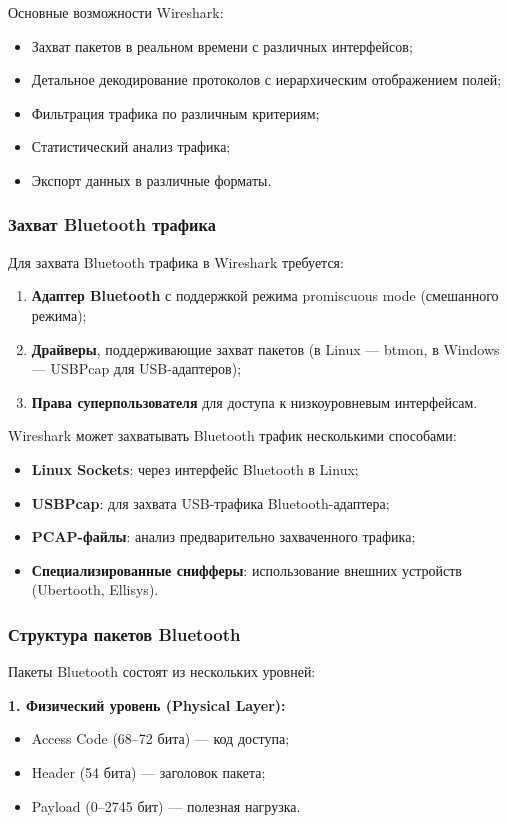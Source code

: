 Основные возможности Wireshark:
\begin{itemize}[nosep]
    \item Захват пакетов в реальном времени с различных интерфейсов;
    \item Детальное декодирование протоколов с иерархическим отображением полей;
    \item Фильтрация трафика по различным критериям;
    \item Статистический анализ трафика;
    \item Экспорт данных в различные форматы.
\end{itemize}

\subsubsection{Захват Bluetooth трафика}
Для захвата Bluetooth трафика в Wireshark требуется:
\begin{enumerate}[nosep]
    \item \textbf{Адаптер Bluetooth} с поддержкой режима promiscuous mode (смешанного режима);
    \item \textbf{Драйверы}, поддерживающие захват пакетов (в Linux — btmon, в Windows — USBPcap для USB-адаптеров);
    \item \textbf{Права суперпользователя} для доступа к низкоуровневым интерфейсам.
\end{enumerate}

Wireshark может захватывать Bluetooth трафик несколькими способами:
\begin{itemize}[nosep]
    \item \textbf{Linux Sockets}: через интерфейс Bluetooth в Linux;
    \item \textbf{USBPcap}: для захвата USB-трафика Bluetooth-адаптера;
    \item \textbf{PCAP-файлы}: анализ предварительно захваченного трафика;
    \item \textbf{Специализированные снифферы}: использование внешних устройств (Ubertooth, Ellisys).
\end{itemize}

\subsubsection{Структура пакетов Bluetooth}
Пакеты Bluetooth состоят из нескольких уровней:

\textbf{1. Физический уровень (Physical Layer):}
\begin{itemize}[nosep]
    \item Access Code (68–72 бита) — код доступа;
    \item Header (54 бита) — заголовок пакета;
    \item Payload (0–2745 бит) — полезная нагрузка.
\end{itemize}


